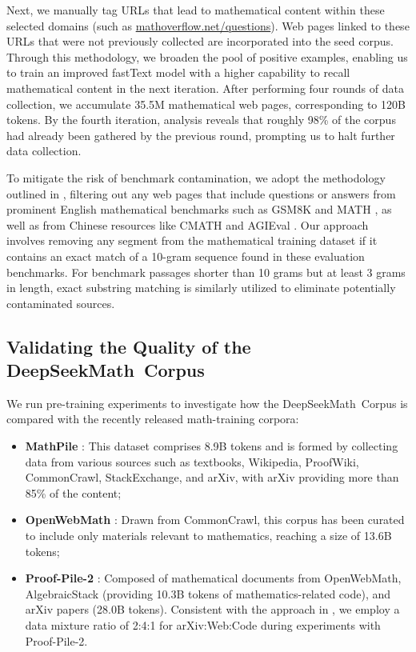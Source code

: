 \begin{itemize}[topsep=0pt]
Next, we manually tag URLs that lead to mathematical content within these selected domains (such as \url{mathoverflow.net/questions}). Web pages linked to these URLs that were not previously collected are incorporated into the seed corpus. Through this methodology, we broaden the pool of positive examples, enabling us to train an improved fastText model with a higher capability to recall mathematical content in the next iteration. After performing four rounds of data collection, we accumulate 35.5M mathematical web pages, corresponding to 120B tokens. By the fourth iteration, analysis reveals that roughly 98\% of the corpus had already been gathered by the previous round, prompting us to halt further data collection.

To mitigate the risk of benchmark contamination, we adopt the methodology outlined in \cite{deepseek-coder}, filtering out any web pages that include questions or answers from prominent English mathematical benchmarks such as GSM8K \citep{gsm8k} and MATH \citep{MATH}, as well as from Chinese resources like CMATH \citep{wei2023cmath} and AGIEval \citep{agieval}. Our approach involves removing any segment from the mathematical training dataset if it contains an exact match of a 10-gram sequence found in these evaluation benchmarks. For benchmark passages shorter than 10 grams but at least 3 grams in length, exact substring matching is similarly utilized to eliminate potentially contaminated sources.

\subsection{Validating the Quality of the DeepSeekMath~Corpus}

We run pre-training experiments to investigate how the DeepSeekMath~Corpus is compared with the recently released math-training corpora:

\begin{itemize}[topsep=0pt]
    \item \textbf{MathPile} \citep{mathpile}: This dataset comprises 8.9B tokens and is formed by collecting data from various sources such as textbooks, Wikipedia, ProofWiki, CommonCrawl, StackExchange, and arXiv, with arXiv providing more than 85\% of the content;
    \item \textbf{OpenWebMath} \citep{openwebmath}: Drawn from CommonCrawl, this corpus has been curated to include only materials relevant to mathematics, reaching a size of 13.6B tokens;
    \item \textbf{Proof-Pile-2} \citep{llemma}: Composed of mathematical documents from OpenWebMath, AlgebraicStack (providing 10.3B tokens of mathematics-related code), and arXiv papers (28.0B tokens). Consistent with the approach in \cite{llemma}, we employ a data mixture ratio of 2:4:1 for arXiv:Web:Code during experiments with Proof-Pile-2.
\end{itemize}


\end{itemize}
